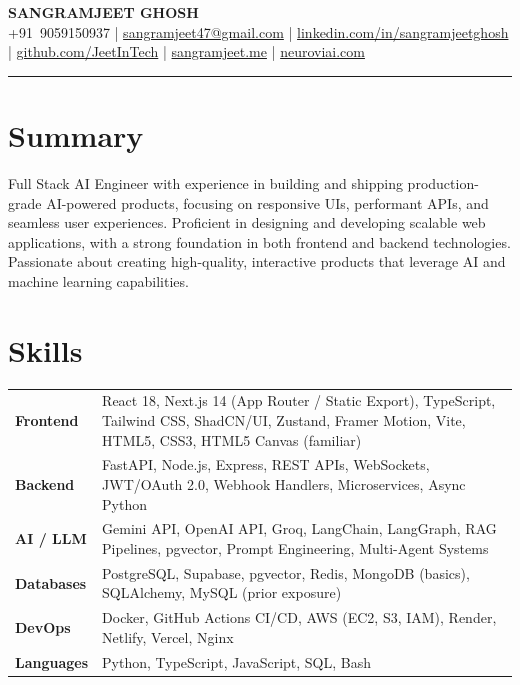 \documentclass[9.5pt]{article}
\begin{document}
\begin{center}
  {\large \textbf{SANGRAMJEET GHOSH}} \\[2pt]
  {\small
    +91~9059150937 \;|\;
    \href{mailto:sangramjeet47@gmail.com}{sangramjeet47@gmail.com} \;|\;
    \href{https://www.linkedin.com/in/sangramjeetghosh}{linkedin.com/in/sangramjeetghosh} \;|\;
    \href{https://github.com/JeetInTech}{github.com/JeetInTech} \;|\;
    \href{https://sangramjeet.me}{sangramjeet.me} \;|\;
    \href{https://neuroviai.com}{neuroviai.com}
  }
\end{center}

\vspace{-2pt}
\noindent\rule{\textwidth}{0.4pt}
\vspace{-4pt}

\section*{Summary}
Full Stack AI Engineer with experience in building and shipping production-grade AI-powered products, focusing on responsive UIs, performant APIs, and seamless user experiences. Proficient in designing and developing scalable web applications, with a strong foundation in both frontend and backend technologies. Passionate about creating high-quality, interactive products that leverage AI and machine learning capabilities.

\section*{Skills}
\begin{tabularx}{\textwidth}{@{} p{2.0cm} X @{}}
\textbf{Frontend}   & React 18, Next.js 14 (App Router / Static Export), TypeScript, Tailwind CSS, ShadCN/UI, Zustand, Framer Motion, Vite, HTML5, CSS3, HTML5 Canvas (familiar) \\[1pt]
\textbf{Backend}    & FastAPI, Node.js, Express, REST APIs, WebSockets, JWT/OAuth 2.0, Webhook Handlers, Microservices, Async Python \\[1pt]
\textbf{AI / LLM}   & Gemini API, OpenAI API, Groq, LangChain, LangGraph, RAG Pipelines, pgvector, Prompt Engineering, Multi-Agent Systems \\[1pt]
\textbf{Databases}  & PostgreSQL, Supabase, pgvector, Redis, MongoDB (basics), SQLAlchemy, MySQL (prior exposure) \\[1pt]
\textbf{DevOps}     & Docker, GitHub Actions CI/CD, AWS (EC2, S3, IAM), Render, Netlify, Vercel, Nginx \\[1pt]
\textbf{Languages}  & Python, TypeScript, JavaScript, SQL, Bash \\
\end{tabularx}
\end{document}

